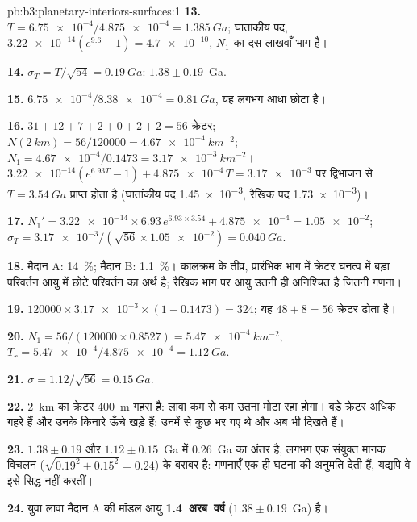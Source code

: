 \begin{solution}{pb:b3:planetary-interiors-surfaces:1}
\textbf{13.} $T = \num{6.75e-4}/\num{4.875e-4} = \qty{1.385}{Ga}$; घातांकीय
पद, $\num{3.22e-14}(e^{9.6} - 1) = \num{4.7e-10}$, $N_1$ का
दस लाखवाँ भाग है।

\textbf{14.} $\sigma_T = T/\sqrt{54} = \qty{0.19}{Ga}$: $1.38 \pm 0.19$~Ga.

\textbf{15.} $\num{6.75e-4}/\num{8.38e-4} = \qty{0.81}{Ga}$, यह
लगभग आधा छोटा है।

\textbf{16.} $31 + 12 + 7 + 2 + 0 + 2 + 2 = 56$ क्रेटर; $N(\qty{2}{km}) =
56/120000 = \qty{4.67e-4}{km^{-2}}$; $N_1 = \num{4.67e-4}/0.1473 =
\qty{3.17e-3}{km^{-2}}$। $\num{3.22e-14}(e^{6.93T} - 1) +
\num{4.875e-4}\,T = \num{3.17e-3}$ पर द्विभाजन से $T = \qty{3.54}{Ga}$ प्राप्त होता है
(घातांकीय पद \num{1.45e-3}, रैखिक पद \num{1.73e-3})।

\textbf{17.} $N_1' = \num{3.22e-14}\times6.93\,e^{6.93\times3.54} +
\num{4.875e-4} = \num{1.05e-2}$; $\sigma_T = \num{3.17e-3}/(\sqrt{56}\times
\num{1.05e-2}) = \qty{0.040}{Ga}$.

\textbf{18.} मैदान A: \qty{14}{\percent}; मैदान B: \qty{1.1}{\percent}। कालक्रम के
तीव्र, प्रारंभिक भाग में क्रेटर घनत्व में बड़ा परिवर्तन
आयु में छोटे परिवर्तन का अर्थ है; रैखिक भाग पर आयु उतनी
ही अनिश्चित है जितनी गणना।

\textbf{19.} $120000\times\num{3.17e-3}\times(1 - 0.1473) = 324$; यह
$48 + 8 = 56$ क्रेटर ढोता है।

\textbf{20.} $N_1 = 56/(120000\times0.8527) = \qty{5.47e-4}{km^{-2}}$,
$T_r = \num{5.47e-4}/\num{4.875e-4} = \qty{1.12}{Ga}$.

\textbf{21.} $\sigma = 1.12/\sqrt{56} = \qty{0.15}{Ga}$.

\textbf{22.} \qty{2}{km} का क्रेटर \qty{400}{m} गहरा है: लावा कम से कम
उतना मोटा रहा होगा। बड़े क्रेटर अधिक गहरे हैं और उनके किनारे ऊँचे खड़े हैं;
उनमें से कुछ भर गए थे और अब भी दिखते हैं।

\textbf{23.} $1.38 \pm 0.19$ और $1.12 \pm 0.15$~Ga में \qty{0.26}{Ga} का अंतर है,
लगभग एक संयुक्त मानक विचलन ($\sqrt{0.19^2 + 0.15^2} = 0.24$) के बराबर है:
गणनाएँ एक ही घटना की अनुमति देती हैं, यद्यपि वे इसे सिद्ध नहीं करतीं।

\textbf{24.} युवा लावा मैदान A की मॉडल आयु
\textbf{1.4~अरब~वर्ष} ($1.38 \pm 0.19$~Ga) है।
\end{solution}
